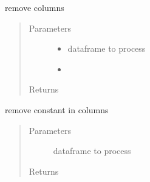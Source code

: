 \documentclass[letterpaper,10pt,english]{sphinxmanual}
\begin{document}

\begin{fulllineitems}
\label{\detokenize{algorithms:algorithms.idp.idp_utils.remove_columns}}
\sphinxAtStartPar
remove columns
\begin{quote}\begin{description}
\item[{Parameters}] \leavevmode\begin{itemize}
\item {} 
\sphinxAtStartPar
{} \textendash{} dataframe to process

\item {} 
\sphinxAtStartPar
{} \textendash{} 

\end{itemize}

\item[{Returns}] \leavevmode
\sphinxAtStartPar


\end{description}\end{quote}

\end{fulllineitems}


\begin{fulllineitems}
\label{\detokenize{algorithms:algorithms.idp.idp_utils.remove_constant_columns}}
\sphinxAtStartPar
remove constant in columns
\begin{quote}\begin{description}
\item[{Parameters}] \leavevmode
\sphinxAtStartPar
{} \textendash{} dataframe to process

\item[{Returns}] \leavevmode
\sphinxAtStartPar


\end{description}\end{quote}

\end{fulllineitems}
\end{document}
